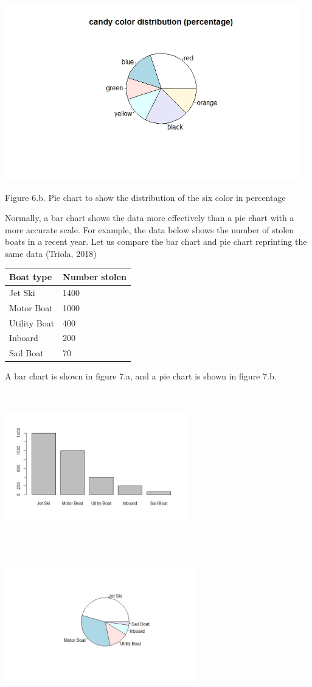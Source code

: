 \includegraphics[width=5.08604in,height=3in]{media/image10.jpeg}

Figure 6.b. Pie chart to show the distribution of the six color in
percentage

Normally, a bar chart shows the data more effectively than a pie chart
with a more accurate scale. For example, the data below shows the number
of stolen boats in a recent year. Let us compare the bar chart and pie
chart reprinting the same data (Triola, 2018)

\begin{longtable}[]{@{}ll@{}}
\toprule
Boat type & Number stolen\tabularnewline
\midrule
\endhead
Jet Ski & 1400\tabularnewline
Motor Boat & 1000\tabularnewline
Utility Boat & 400\tabularnewline
Inboard & 200\tabularnewline
Sail Boat & 70\tabularnewline
\bottomrule
\end{longtable}

A bar chart is shown in figure 7.a, and a pie chart is shown in figure
7.b.

\includegraphics[width=3.12017in,height=2.6in]{media/image11.jpeg}\includegraphics[width=3.2528in,height=2.7in]{media/image12.jpeg}

